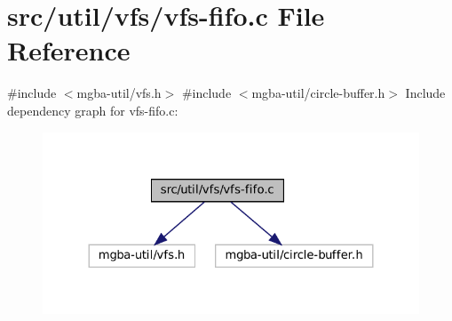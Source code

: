 \hypertarget{vfs-fifo_8c}{}\section{src/util/vfs/vfs-\/fifo.c File Reference}
\label{vfs-fifo_8c}
{\ttfamily \#include $<$mgba-\/util/vfs.\+h$>$}\newline
{\ttfamily \#include $<$mgba-\/util/circle-\/buffer.\+h$>$}\newline
Include dependency graph for vfs-\/fifo.c\+:
\nopagebreak
\begin{figure}[H]
\begin{center}
\leavevmode
\includegraphics[width=324pt]{vfs-fifo_8c__incl}
\end{center}
\end{figure}
